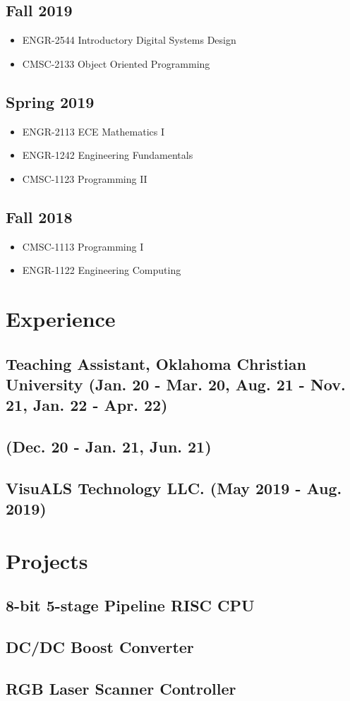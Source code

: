 \documentclass{article}
\begin{document}
		\subsection{Fall 2019}
			\begin{itemize}
				\item ENGR-2544 Introductory Digital Systems Design
				\item CMSC-2133 Object Oriented Programming
			\end{itemize}
		\subsection{Spring 2019}
			\begin{itemize}
				\item ENGR-2113 ECE Mathematics I
				\item ENGR-1242 Engineering Fundamentals
				\item CMSC-1123 Programming II
			\end{itemize}
		\subsection{Fall 2018}
			\begin{itemize}
				\item CMSC-1113 Programming I
				\item ENGR-1122 Engineering Computing
			\end{itemize}

\section{Experience}
	\subsection{Teaching Assistant, Oklahoma Christian University (Jan. 20 - Mar. 20, Aug. 21 - Nov. 21, Jan. 22 - Apr. 22)}
	\subsection{(Dec. 20 - Jan. 21, Jun. 21)}
	\subsection{VisuALS Technology LLC. (May 2019 - Aug. 2019)}

\section{Projects}
	\subsection{8-bit 5-stage Pipeline RISC CPU}
	\subsection{DC/DC Boost Converter}
	\subsection{RGB Laser Scanner Controller}
\end{document}
